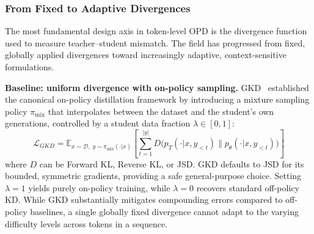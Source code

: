 \documentclass{article} %
\newcommand{\ptheta}{p_\theta}
\newcommand{\pteacher}{p_T}
\begin{document}
\subsubsection{From Fixed to Adaptive Divergences}

The most fundamental design axis in token-level OPD is the divergence function used to measure teacher--student mismatch. The field has progressed from fixed, globally applied divergences toward increasingly adaptive, context-sensitive formulations.

\textbf{Baseline: uniform divergence with on-policy sampling.}
GKD~\citep{2306.13649} established the canonical on-policy distillation framework by introducing a mixture sampling policy $\pi_{\mathrm{mix}}$ that interpolates between the dataset and the student's own generations, controlled by a student data fraction $\lambda \in [0,1]$:
\begin{equation}
    \mathcal{L}_{GKD} = \mathbb{E}_{x \sim \mathcal{D},\; y \sim \pi_{\mathrm{mix}}(\cdot|x)} \left[ \sum_{t=1}^{|y|} D\big( \pteacher(\cdot|x, y_{<t}) \parallel \ptheta(\cdot|x, y_{<t}) \big) \right]
    \label{eq:gkd}
\end{equation}
where $D$ can be Forward KL, Reverse KL, or JSD. GKD defaults to JSD for its bounded, symmetric gradients, providing a safe general-purpose choice. Setting $\lambda=1$ yields purely on-policy training, while $\lambda=0$ recovers standard off-policy KD. While GKD substantially mitigates compounding errors compared to off-policy baselines, a single globally fixed divergence cannot adapt to the varying difficulty levels across tokens in a sequence.
\end{document}
